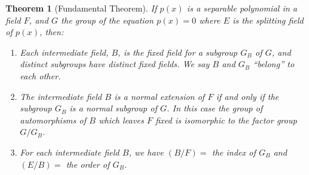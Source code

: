 \documentclass[10pt,leqno,a5paper]{book}
\newtheorem{theo}{Theorem}
\theoremstyle{definition}
\begin{document}
\begin{theo}[Fundamental Theorem]
\label{theo:onsi}
If $p(x)$ is a separable polynomial in a field $F$, and $G$ the group of the equation $p(x) = 0$ where $E$ is the splitting field of $p(x)$, then:
\begin{enumerate}
\item
Each intermediate field, $B$, is the fixed field for a subgroup $G_B$ of $G$, and distinct subgroups have distinct fixed fields.
We say $B$ and $G_B$ ``belong'' to each other.

\item
The intermediate field $B$ is a normal extension of $F$ if and only if the subgroup $G_B$ is a normal subgroup of $G$.
In this case the group of automorphisms of $B$ which leaves $F$ fixed is isomorphic to the factor group $G/G_B$.

\item
For each intermediate field $B$, we have $(B/F) =$ the index of $G_B$ and $(E/B) =$ the order of $G_B$.
\end{enumerate}
\end{theo}
\end{document}
